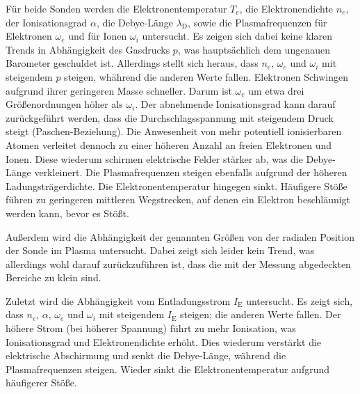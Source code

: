 F\"ur beide Sonden werden die Elektronentemperatur $T_e$, die Elektronendichte $n_e$, der Ionisationsgrad $\alpha$, die Debye-L\"ange $\lambda_\text{D}$, sowie die Plasmafrequenzen f\"ur Elektronen $\omega_e$ und f\"ur Ionen $\omega_i$ untersucht.
Es zeigen sich dabei keine klaren Trends in Abh\"angigkeit des Gasdrucks $p$, was haupts\"achlich dem ungenauen Barometer geschuldet ist.
Allerdings stellt sich heraus, dass $n_e$, $\omega_e$ und $\omega_i$ mit steigendem $p$ steigen, wh\"ahrend die anderen Werte fallen.
Elektronen Schwingen aufgrund ihrer geringeren Masse schneller.
Darum ist $\omega_e$ um etwa drei Gr\"o\ss enordnungen h\"oher als $\omega_i$.
Der abnehmende Ionisationsgrad kann darauf zur\"uckgef\"uhrt werden, dass die Durchschlagsspannung mit steigendem Druck steigt (Paschen-Beziehung).
Die Anwesenheit von mehr potentiell ionisierbaren Atomen verleitet dennoch zu einer h\"oheren Anzahl an freien Elektronen und Ionen.
Diese wiederum schirmen elektrische Felder st\"arker ab, was die Debye-L\"ange verkleinert.
Die Plasmafrequenzen steigen ebenfalls aufgrund der h\"oheren Ladungstr\"agerdichte.
Die Elektronentemperatur hingegen sinkt.
H\"aufigere St\"o\ss e f\"uhren zu geringeren mittleren Wegstrecken, auf denen ein Elektron beschl\"aunigt werden kann, bevor es St\"o\ss t.

Au\ss erdem wird die Abh\"angigkeit der genannten Gr\"o\ss en von der radialen Position der Sonde im Plasma untersucht.
Dabei zeigt sich leider kein Trend, was allerdings wohl darauf zur\"uckzuf\"uhren ist, dass die mit der Messung abgedeckten Bereiche zu klein sind.

Zuletzt wird die Abh\"angigkeit vom Entladungsstrom $I_\text{E}$ untersucht.
Es zeigt sich, dass $n_e$, $\alpha$, $\omega_e$ und $\omega_i$ mit steigendem $I_\text{E}$ steigen; die anderen Werte fallen.
Der h\"ohere Strom (bei h\"oherer Spannung) f\"uhrt zu mehr Ionisation, was Ionisationsgrad und Elektronendichte erh\"oht.
Dies wiederum verst\"arkt die elektrische Abschirmung und senkt die Debye-L\"ange, w\"ahrend die Plasmafrequenzen steigen.
Wieder sinkt die Elektronentemperatur aufgrund h\"aufigerer St\"o\ss e.